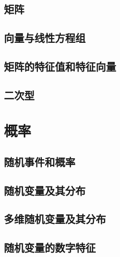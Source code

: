 \documentclass[lang=cn,math=mtpro2,11pt,scheme=chinese]{elegantbook}
\begin{document}
\section{矩阵}

\vspace{2em}

\section{向量与线性方程组}

\vspace{2em}

\section{矩阵的特征值和特征向量}

\vspace{2em}

\section{二次型}

\vspace{2em}

\chapter{概率}

\section{随机事件和概率}

\vspace{2em}

\section{随机变量及其分布}

\vspace{2em}

\section{多维随机变量及其分布}

\vspace{2em}

\section{随机变量的数字特征}

\vspace{2em}
\end{document}
